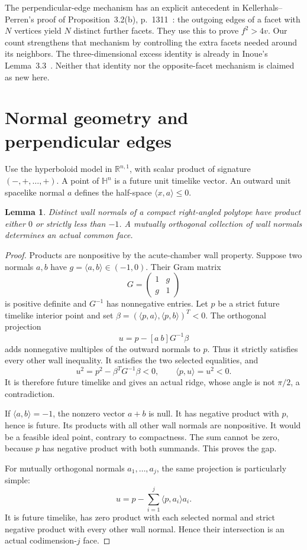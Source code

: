 \documentclass[11pt]{article}
\newtheorem{lemma}[theorem]{Lemma}
\theoremstyle{remark}
\newcommand{\HH}{\mathbb H}
\newcommand{\ip}[2]{\langle #1,#2\rangle}
\begin{document}
The perpendicular-edge mechanism has an explicit antecedent in
Kellerhals--Perren's proof of Proposition~3.2(b), p.~1311~\cite{KP}:
the outgoing edges of a facet with $N$ vertices yield $N$ distinct
further facets. They use this to prove $f^2>4v$. Our count strengthens
that mechanism by controlling the extra facets needed around its
neighbors. The three-dimensional excess identity is already in
Inoue's Lemma~3.3~\cite{Inoue}. Neither that identity nor the
opposite-facet mechanism is claimed as new here.

\section{Normal geometry and perpendicular edges}

Use the hyperboloid model in $\mathbb R^{n,1}$, with scalar product of
signature $(-,+,\ldots,+)$. A point of $\HH^n$ is a future unit timelike
vector. An outward unit spacelike normal $a$ defines the half-space
$\ip{x}{a}\le0$.

\begin{lemma}\label{lem:gap}
Distinct wall normals of a compact right-angled polytope have product
either $0$ or strictly less than $-1$. A mutually orthogonal collection
of wall normals determines an actual common face.
\end{lemma}
\begin{proof}
Products are nonpositive by the acute-chamber wall property. Suppose
two normals $a,b$ have $g=\ip{a}{b}\in(-1,0)$. Their Gram matrix
\[
 G=\begin{pmatrix}1&g\\g&1\end{pmatrix}
\]
is positive definite and $G^{-1}$ has nonnegative entries. Let $p$ be a
strict future timelike interior point and set
$\beta=(\ip{p}{a},\ip{p}{b})^T<0$. The orthogonal projection
\[
 u=p-[a\ b]G^{-1}\beta
\]
adds nonnegative multiples of the outward normals to $p$. Thus it
strictly satisfies every other wall inequality. It satisfies the two
selected equalities, and
\[
 u^2=p^2-\beta^TG^{-1}\beta<0,\qquad
 \ip{p}{u}=u^2<0.
\]
It is therefore future timelike and gives an actual ridge, whose angle
is not $\pi/2$, a contradiction.

If $\ip{a}{b}=-1$, the nonzero vector $a+b$ is null. It has negative
product with $p$, hence is future. Its products with all other wall
normals are nonpositive. It would be a feasible ideal point, contrary
to compactness. The sum cannot be zero, because $p$ has negative product
with both summands. This proves the gap.

For mutually orthogonal normals $a_1,\ldots,a_j$, the same projection is
particularly simple:
\[
 u=p-\sum_{i=1}^j\ip{p}{a_i}a_i.
\]
It is future timelike, has zero product with each selected normal and
strict negative product with every other wall normal. Hence their
intersection is an actual codimension-$j$ face.
\end{proof}
\end{document}
